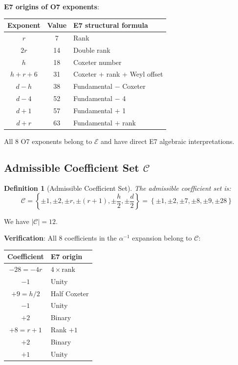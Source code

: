 \documentclass[11pt,a4paper]{article}
\newtheorem{definition}{Definition}
\begin{document}
\textbf{E7 origins of O7 exponents}:
\begin{center}
\begin{tabular}{|c|c|l|}
\hline
\textbf{Exponent} & \textbf{Value} & \textbf{E7 structural formula} \\
\hline
$r$ & 7 & Rank \\
$2r$ & 14 & Double rank \\
$h$ & 18 & Coxeter number \\
$h+r+6$ & 31 & Coxeter + rank + Weyl offset \\
$d-h$ & 38 & Fundamental $-$ Coxeter \\
$d-4$ & 52 & Fundamental $-$ 4 \\
$d+1$ & 57 & Fundamental $+$ 1 \\
$d+r$ & 63 & Fundamental $+$ rank \\
\hline
\end{tabular}
\end{center}

All 8 O7 exponents belong to $\mathcal{E}$ and have direct E7 algebraic interpretations.

\subsection{Admissible Coefficient Set $\mathcal{C}$}

\begin{definition}[Admissible Coefficient Set]
The admissible coefficient set is:
\begin{equation}
\mathcal{C} = \left\{ \pm 1, \pm 2, \pm r, \pm (r+1), \pm \frac{h}{2}, \pm \frac{d}{2} \right\} = \left\{ \pm 1, \pm 2, \pm 7, \pm 8, \pm 9, \pm 28 \right\}
\end{equation}
\end{definition}

We have $|\mathcal{C}| = 12$.

\textbf{Verification}: All 8 coefficients in the $\alpha^{-1}$ expansion belong to $\mathcal{C}$:
\begin{center}
\begin{tabular}{|c|l|}
\hline
\textbf{Coefficient} & \textbf{E7 origin} \\
\hline
$-28 = -4r$ & $4 \times \text{rank}$ \\
$-1$ & Unity \\
$+9 = h/2$ & Half Coxeter \\
$-1$ & Unity \\
$+2$ & Binary \\
$+8 = r+1$ & Rank $+ 1$ \\
$+2$ & Binary \\
$+1$ & Unity \\
\hline
\end{tabular}
\end{center}
\end{document}
